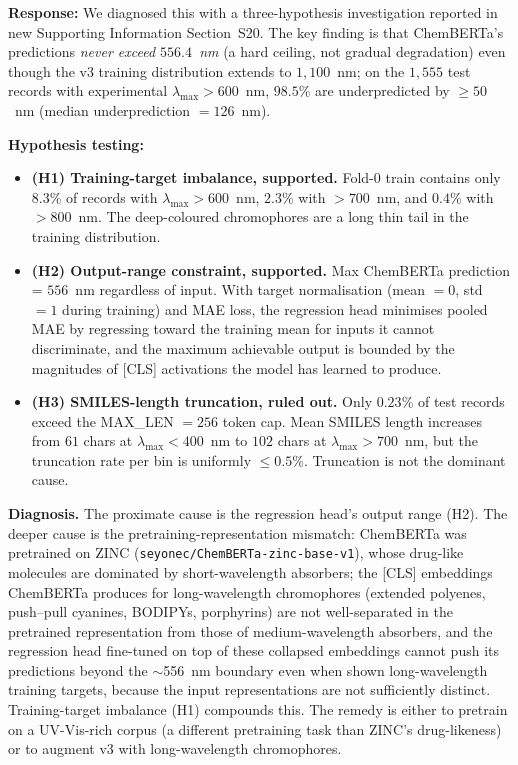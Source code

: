 \documentclass[11pt]{article}
\newcommand{\response}[1]{\noindent\textbf{Response:} #1\par\medskip}
\begin{document}
\response{We diagnosed this with a three-hypothesis investigation reported in new Supporting Information Section~S20. The key finding is that ChemBERTa's predictions \emph{never exceed $556.4$~nm} (a hard ceiling, not gradual degradation) even though the v3 training distribution extends to $1{,}100$~nm; on the $1{,}555$ test records with experimental $\lambda_{\max} > 600$~nm, $98.5$\% are underpredicted by $\geq 50$~nm (median underprediction $= 126$~nm).

\textbf{Hypothesis testing:}
\begin{itemize}[leftmargin=2em,itemsep=2pt]
  \item \textbf{(H1) Training-target imbalance, supported.} Fold-0 train contains only $8.3$\% of records with $\lambda_{\max} > 600$~nm, $2.3$\% with $> 700$~nm, and $0.4$\% with $> 800$~nm. The deep-coloured chromophores are a long thin tail in the training distribution.
  \item \textbf{(H2) Output-range constraint, supported.} Max ChemBERTa prediction = $556$~nm regardless of input. With target normalisation (mean $= 0$, std $= 1$ during training) and MAE loss, the regression head minimises pooled MAE by regressing toward the training mean for inputs it cannot discriminate, and the maximum achievable output is bounded by the magnitudes of [CLS] activations the model has learned to produce.
  \item \textbf{(H3) SMILES-length truncation, ruled out.} Only $0.23$\% of test records exceed the MAX\_LEN $= 256$ token cap. Mean SMILES length increases from $61$ chars at $\lambda_{\max} < 400$~nm to $102$ chars at $\lambda_{\max} > 700$~nm, but the truncation rate per bin is uniformly $\leq 0.5$\%. Truncation is not the dominant cause.
\end{itemize}

\textbf{Diagnosis.} The proximate cause is the regression head's output range (H2). The deeper cause is the pretraining-representation mismatch: ChemBERTa was pretrained on ZINC (\texttt{seyonec/ChemBERTa-zinc-base-v1}), whose drug-like molecules are dominated by short-wavelength absorbers; the [CLS] embeddings ChemBERTa produces for long-wavelength chromophores (extended polyenes, push--pull cyanines, BODIPYs, porphyrins) are not well-separated in the pretrained representation from those of medium-wavelength absorbers, and the regression head fine-tuned on top of these collapsed embeddings cannot push its predictions beyond the $\sim$556~nm boundary even when shown long-wavelength training targets, because the input representations are not sufficiently distinct. Training-target imbalance (H1) compounds this. The remedy is either to pretrain on a UV-Vis-rich corpus (a different pretraining task than ZINC's drug-likeness) or to augment v3 with long-wavelength chromophores.

}
\end{document}
